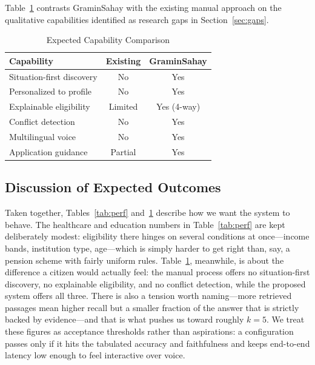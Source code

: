 \documentclass[conference]{IEEEtran}
\begin{document}
Table~\ref{tab:cap} contrasts GraminSahay with the existing manual approach on the qualitative capabilities identified as research gaps in Section~\ref{sec:gaps}.

\begin{table}[htbp]
\caption{Expected Capability Comparison}
\label{tab:cap}
\centering
\begin{tabular}{lcc}
\toprule
\textbf{Capability} & \textbf{Existing} & \textbf{GraminSahay} \\
\midrule
Situation-first discovery & No & Yes \\
Personalized to profile & No & Yes \\
Explainable eligibility & Limited & Yes (4-way) \\
Conflict detection & No & Yes \\
Multilingual voice & No & Yes \\
Application guidance & Partial & Yes \\
\bottomrule
\end{tabular}
\end{table}

\subsection{Discussion of Expected Outcomes}
Taken together, Tables~\ref{tab:perf} and~\ref{tab:cap} describe how we want the system to behave. The healthcare and education numbers in Table~\ref{tab:perf} are kept deliberately modest: eligibility there hinges on several conditions at once---income bands, institution type, age---which is simply harder to get right than, say, a pension scheme with fairly uniform rules. Table~\ref{tab:cap}, meanwhile, is about the difference a citizen would actually feel: the manual process offers no situation-first discovery, no explainable eligibility, and no conflict detection, while the proposed system offers all three. There is also a tension worth naming---more retrieved passages mean higher recall but a smaller fraction of the answer that is strictly backed by evidence---and that is what pushes us toward roughly $k = 5$. We treat these figures as acceptance thresholds rather than aspirations: a configuration passes only if it hits the tabulated accuracy and faithfulness and keeps end-to-end latency low enough to feel interactive over voice.
\end{document}
